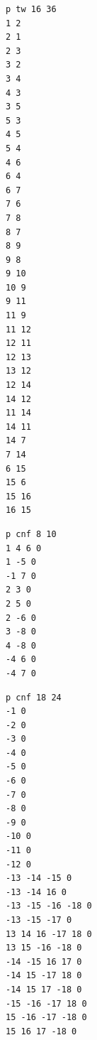 \documentclass[a4paper, 12pt]{scrartcl}
\begin{document}
\lstset{numbers=none}
\begin{lstlisting}[caption={Edge encoding of example graph with 16 vertices}, label={lst:minvc16}]
p tw 16 36
1 2
2 1
2 3
3 2
3 4
4 3
3 5
5 3
4 5
5 4
4 6
6 4
6 7
7 6
7 8
8 7
8 9
9 8
9 10
10 9
9 11
11 9
11 12
12 11
12 13
13 12
12 14
14 12
11 14
14 11
14 7
7 14
6 15
15 6
15 16
16 15
\end{lstlisting}
\begin{lstlisting}[caption={CNF clauses from example 4.1 on page 27 \cite{DiplomarbeitZisser}}, label={lst:clausesDA41}]
p cnf 8 10
1 4 6 0
1 -5 0
-1 7 0
2 3 0
2 5 0
2 -6 0
3 -8 0
4 -8 0
-4 6 0
-4 7 0
\end{lstlisting}
\begin{lstlisting}[caption={CNF clauses from random example with 12 units},label={lst:example18-24}]
p cnf 18 24
-1 0
-2 0
-3 0
-4 0
-5 0
-6 0
-7 0
-8 0
-9 0
-10 0
-11 0
-12 0
-13 -14 -15 0
-13 -14 16 0
-13 -15 -16 -18 0
-13 -15 -17 0
13 14 16 -17 18 0
13 15 -16 -18 0
-14 -15 16 17 0
-14 15 -17 18 0
-14 15 17 -18 0
-15 -16 -17 18 0
15 -16 -17 -18 0
15 16 17 -18 0
\end{lstlisting}



\newpage
\printbibliography
%
\end{document}
